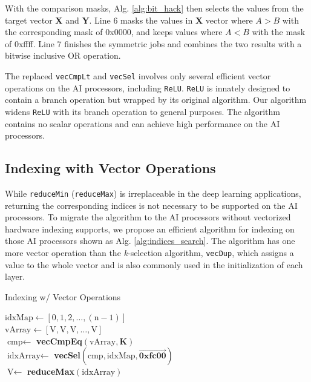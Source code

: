 \documentclass[12pt]{extbook}
\begin{document}
With the comparison masks, Alg. \ref{alg:bit_hack} then selects the values from the target vector \textbf{X} and \textbf{Y}. Line 6 masks the values in \textbf{X} vector where $A > B$ with the corresponding mask of 0x0000, and keeps values where $A < B$ with the mask of 0xffff. Line 7 finishes the symmetric jobs and combines the two results with a bitwise inclusive OR operation.

The replaced \verb|vecCmpLt| and \verb|vecSel| involves only several efficient vector operations on the AI processors, including \verb|ReLU|. \verb|ReLU| is innately designed to contain a branch operation but wrapped by its original algorithm. Our algorithm widens \verb|ReLU| with its branch operation to general purposes. The algorithm contains no scalar operations and can achieve high performance on the AI processors.

\subsection{Indexing with Vector Operations}

While \verb|reduceMin| (\verb|reduceMax|) is irreplaceable in the deep learning applications, returning the corresponding indices is not necessary to be supported on the AI processors. To migrate the algorithm to the AI processors without vectorized hardware indexing supports, we propose an efficient algorithm for indexing on those AI processors shown as Alg. \ref{alg:indices_search}. The algorithm has one more vector operation than the \textit{k}-selection algorithm, \verb|vecDup|, which assigns a value to the whole vector and is also commonly used in the initialization of each layer.

\begin{algorithm}[tbp]
    \caption{Indexing w/ Vector Operations}
    \label{alg:indices_search}
        
        
            
    \BlankLine
    
    $\text{idxMap} \leftarrow [0, 1, 2, \dots, (\text{n}-1)]$ \\
    $\text{vArray} \leftarrow [\text{V}, \text{V}, \text{V}, \dots, \text{V}]$ \\
    $\text{cmp} \leftarrow $ \textbf{vecCmpEq}$(\text{vArray}, \textbf{K})$  \\
    $\text{idxArray} \leftarrow $ \textbf{vecSel}$(\text{cmp}, \text{idxMap}, \vec{\textbf{0xfc00}})$ \\
    $\text{V} \leftarrow$ \textbf{reduceMax}$(\text{idxArray})$ \\
\end{algorithm}
\end{document}
